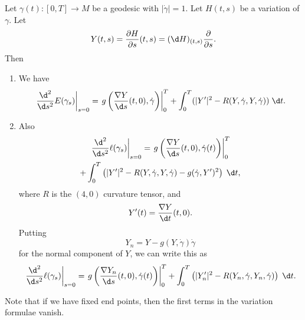 \documentclass[a4paper]{article}
\begin{document}
\begin{thm}\leavevmode
  Let $\gamma(t): [0, T] \to M$ be a geodesic with $|\dot{\gamma}| = 1$. Let $H(t, s)$ be a variation of $\gamma$. Let
  \[
    Y(t, s) = \frac{\partial H}{\partial s}(t, s) = (\d H)_{(t, s)} \frac{\partial}{\partial s}.
  \]
  Then
  \begin{enumerate}
    \item We have
      \[
        \left.\frac{\d^2}{\d s^2} E(\gamma_s)\right|_{s = 0} = \left.g\left(\frac{\nabla Y}{\d s}(t, 0), \dot{\gamma}\right)\right|_0^T + \int_0^T (|Y'|^2 - R(Y, \dot\gamma, Y, \dot{\gamma})) \;\d t.
      \]
    \item Also
      \begin{multline*}
        \left.\frac{\d^2}{\d s^2}\ell(\gamma_s)\right|_{s = 0} = \left.g\left(\frac{\nabla Y}{\d s} (t, 0), \dot{\gamma}(t)\right)\right|_0^T \\
        + \int_0^T \left( |Y'|^2 - R(Y, \dot{\gamma}, Y, \dot{\gamma}) - g(\dot{\gamma}, Y')^2\right)\;\d t,
      \end{multline*}
      where $R$ is the $(4, 0)$ curvature tensor, and
      \[
        Y'(t) = \frac{\nabla Y}{\d t}(t, 0).
      \]
      Putting
      \[
        Y_n = Y - g(Y, \dot{\gamma}) \dot{\gamma}
      \]
      for the normal component of $Y$, we can write this as
      \[
        \left.\frac{\d^2}{\d s^2}\ell(\gamma_s)\right|_{s = 0} = \left.g\left(\frac{\nabla Y_n}{\d s} (t, 0), \dot{\gamma}(t)\right)\right|_0^T + \int_0^T \left( |Y'_n|^2 - R(Y_n, \dot{\gamma}, Y_n, \dot{\gamma})\right)\;\d t.
      \]
  \end{enumerate}
\end{thm}
Note that if we have fixed end points, then the first terms in the variation formulae vanish.
\end{document}
